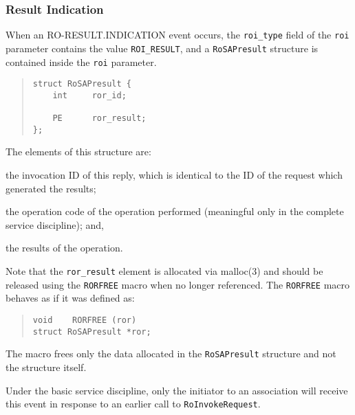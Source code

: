 \subsubsection  {Result Indication}
When an {\sf RO-RESULT.INDICATION\/} event occurs,
the \verb"roi_type" field of the \verb"roi" parameter contains the value
\verb"ROI_RESULT",
and a \verb"RoSAPresult" structure is contained inside the \verb"roi"
parameter.
\begin{quote}\small\begin{verbatim}
struct RoSAPresult {
    int     ror_id;

    PE      ror_result;
};
\end{verbatim}\end{quote}
The elements of this structure are:
\begin{describe}
\item[\verb"ror\_id":] the invocation ID of this reply,
which is identical to the ID of the request which generated the results;

\item[\verb"ror\_op":] the operation code of the operation performed
(meaningful only in the complete service discipline);
and,

\item[\verb"ror\_result":] the results of the operation.
\end{describe}
Note that the \verb"ror_result" element is allocated via \man malloc(3) and
should be released using the \verb"RORFREE" macro  when no longer referenced.
The \verb"RORFREE" macro behaves as if it was defined as:
\begin{quote}\small\begin{verbatim}
void    RORFREE (ror)
struct RoSAPresult *ror;
\end{verbatim}\end{quote}
The macro frees only the data allocated in the \verb"RoSAPresult" structure
and not the structure itself.

Under the basic service discipline,
only the initiator to an association will receive this event in response to
an earlier call to \verb"RoInvokeRequest".

